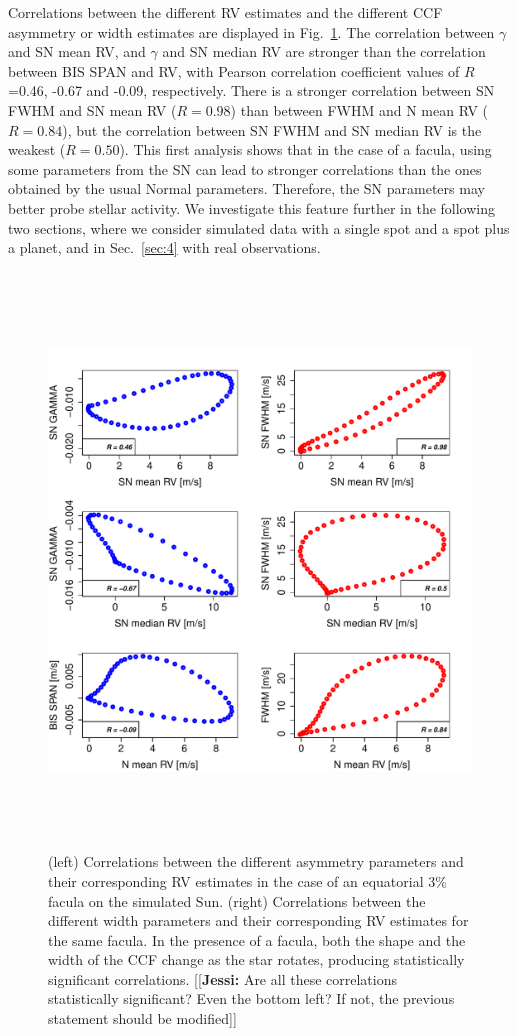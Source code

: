 \documentclass{aa}
\newcommand{\jessi}[1]{{\color{Purple}[[\textbf{Jessi: }#1]]}}
\begin{document}
Correlations between the different RV estimates and the different CCF asymmetry or width estimates are displayed in Fig.~\ref{fig:faculae.corr}. 
The correlation between $\gamma$ and SN mean RV, and $\gamma$ and SN median RV are stronger than the correlation between BIS SPAN and RV, with Pearson correlation coefficient values of $R$=0.46, -0.67 and -0.09, respectively. 
%
There is a stronger correlation between SN FWHM and SN mean RV ($R=0.98$) than between FWHM and N mean RV ($R=0.84$), but the correlation between SN FWHM and SN median RV is the weakest ($R=0.50$). 
This first analysis shows that in the case of a facula, using some parameters from the SN can lead to stronger correlations than the ones obtained by the usual Normal parameters. Therefore, the SN parameters may better probe stellar activity. 
We investigate this feature further in the following two sections, where we consider simulated data with a single spot and a spot plus a planet, and in Sec.~\ref{sec:4} with real observations.

\begin{figure}[htbp]
\begin{center}
\includegraphics[height = 6in]{SOAP_FACULAE_Comparison_para_SN.pdf} 
   \caption{(left) Correlations between the different asymmetry parameters and their corresponding RV estimates in the case of an equatorial 3\% facula on the simulated Sun. (right) Correlations between the different width parameters and their corresponding RV estimates for the same facula.
   In the presence of a facula, both the shape and the width of the CCF change as the star rotates, producing statistically significant correlations.
 \jessi{Are all these correlations statistically significant?  Even the bottom left?  If not, the previous statement should be modified}
   }
    \label{fig:faculae.corr}
\end{center}
\end{figure}
\end{document}
